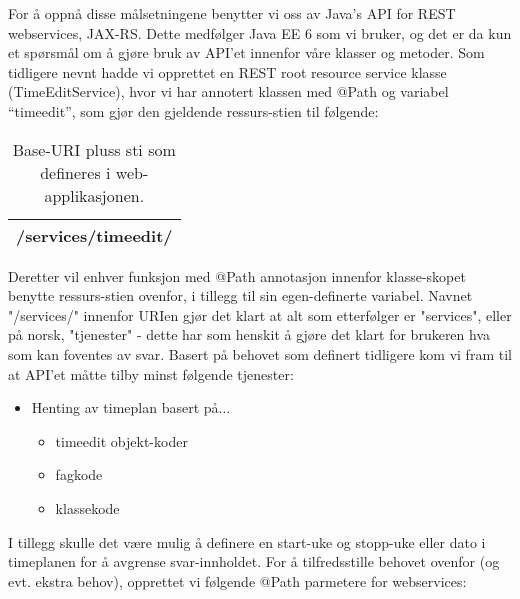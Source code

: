 \documentclass[../main.tex]{subfiles}
\begin{document}
For å oppnå disse målsetningene benytter vi oss av Java’s API for REST webservices, JAX-RS. Dette medfølger Java EE 6 som vi bruker, og det er da kun et spørsmål om å gjøre bruk av API’et innenfor våre klasser og metoder.
Som tidligere nevnt hadde vi opprettet en REST root resource service klasse (TimeEditService), hvor vi har annotert klassen med @Path og variabel “timeedit”, som gjør den gjeldende ressurs-stien til følgende:
\begin{table}[H]
\begin{center}
\caption{Base-URI pluss sti som defineres i web-applikasjonen.}
\begin{tabular}{| p{12cm} |}
\hline
 [SERVERPATH]/services/timeedit/ \\ \hline
\end{tabular}
\end{center}
\end{table}
Deretter vil enhver funksjon med @Path annotasjon innenfor klasse-skopet benytte ressurs-stien ovenfor, i tillegg til sin egen-definerte variabel. Navnet "/services/" innenfor URIen gjør det klart at alt som etterfølger er "services", eller på norsk, "tjenester" - dette har som henskit å gjøre det klart for brukeren hva som kan foventes av svar.\newline
Basert på behovet som definert tidligere kom vi fram til at API’et måtte tilby minst følgende tjenester:

\begin{itemize}
\item Henting av timeplan basert på...
\begin{itemize}
\item timeedit objekt-koder
\item fagkode
\item klassekode
\end{itemize}
\end{itemize}

I tillegg skulle det være mulig å definere en start-uke og stopp-uke eller dato i timeplanen for å avgrense svar-innholdet.\newline
For å tilfredsstille behovet ovenfor (og evt. ekstra behov), opprettet vi følgende @Path parmetere for webservices:
\end{document}
